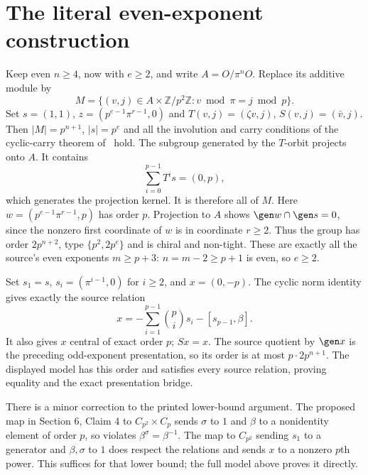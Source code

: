 \section{The literal even-exponent construction}
Keep even $n\geq4$, now with $e\geq2$, and write $A=O/\pi^nO$.
Replace its additive module by
\[
M=\{(v,j)\in A\times\mathbb Z/p^2\mathbb Z:
                 v\bmod\pi=j\bmod p\}.
\]
Set $s=(1,1)$, $z=(p^{e-1}\pi^{r-1},0)$ and
$T(v,j)=(\zeta v,j)$, $S(v,j)=(\bar v,j)$.
Then $|M|=p^{n+1}$, $|s|=p^e$ and all the involution and carry
conditions of the cyclic-carry theorem of~\cite{UF} hold. The subgroup generated
by the $T$-orbit projects onto $A$. It contains
\[
\sum_{i=0}^{p-1}T^is=(0,p),
\]
which generates the projection kernel. It is therefore all of $M$.
Here $w=(p^{e-1}\pi^{r-1},p)$ has order $p$. Projection to $A$
shows $\gen w\cap\gen s=0$, since the nonzero first coordinate
of $w$ is in coordinate $r\geq2$. Thus the group has order
$2p^{n+2}$, type $\{p^2,2p^e\}$ and is chiral and non-tight.
These are exactly all the source's even exponents $m\geq p+3$:
$n=m-2\geq p+1$ is even, so $e\geq2$.

Set $s_1=s$, $s_i=(\pi^{i-1},0)$ for $i\geq2$, and
$x=(0,-p)$. The cyclic norm identity gives exactly the source relation
\[
x=-\sum_{i=1}^{p-1}\binom pi s_i-[s_{p-1},\beta].
\]
It also gives $x$ central of exact order $p$; $Sx=x$.
The source quotient by $\gen x$ is the preceding odd-exponent
presentation, so its order is at most $p\cdot2p^{n+1}$.
The displayed model has this order and satisfies every source
relation, proving equality and the exact presentation bridge.

There is a minor correction to the printed lower-bound argument.
The proposed map in Section 6, Claim 4 to
$C_{p^2}\times C_p$ sends $\sigma$ to $1$ and $\beta$ to a
nonidentity element of order $p$, so violates
$\beta^\sigma=\beta^{-1}$. The map to $C_{p^2}$ sending
$s_1$ to a generator and $\beta,\sigma$ to $1$ does respect the
relations and sends $x$ to a nonzero $p$th power. This suffices
for that lower bound; the full model above proves it directly.

